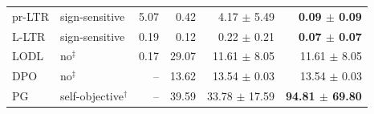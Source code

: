 \begin{table}[!h]
\begin{tabular}{l l r r r r}
pr-LTR & sign-sensitive & 5.07 & 0.42 & 4.17 $\pm$ 5.49 & \textbf{0.09 $\pm$ 0.09} \\
L-LTR & sign-sensitive & 0.19 & 0.12 & 0.22 $\pm$ 0.21 & \textbf{0.07 $\pm$ 0.07} \\
LODL & no$^{\ddagger}$ & 0.17 & 29.07 & 11.61 $\pm$ 8.05 & 11.61 $\pm$ 8.05 \\
DPO & no$^{\ddagger}$ & -- & 13.62 & 13.54 $\pm$ 0.03 & 13.54 $\pm$ 0.03 \\
PG & self-objective$^{\dagger}$ & -- & 39.59 & 33.78 $\pm$ 17.59 & \textbf{94.81 $\pm$ 69.80} \\
\bottomrule
\end{tabular}
\end{table}
